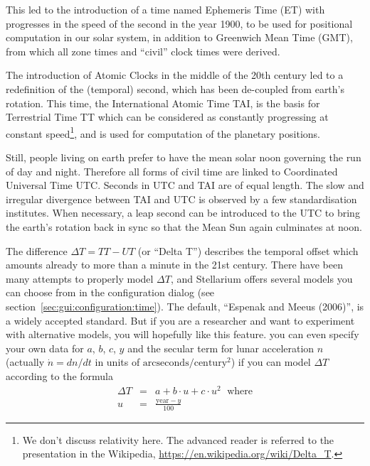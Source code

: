 This led to the introduction of a time named Ephemeris Time (ET) with
progresses in the speed of the second in the year 1900, to be used for
positional computation in our solar system, in addition to Greenwich
Mean Time (GMT), from which all zone times and ``civil'' clock times were
derived.

The introduction of Atomic Clocks in the middle of the 20th century
led to a redefinition of the (temporal) second, which has been
de-coupled from earth's rotation. This time, the International Atomic
Time TAI, is the basis for Terrestrial Time TT which can be
considered as constantly progressing at constant speed\footnote{We
  don't discuss relativity here. The advanced reader is referred to
  the presentation in the Wikipedia,
  \url{https://en.wikipedia.org/wiki/Delta_T}.}, and is used for
computation of the planetary positions.

Still, people living on earth prefer to have the mean solar noon
governing the run of day and night. Therefore all forms of civil time
are linked to Coordinated Universal Time UTC. Seconds in UTC and TAI
are of equal length. The slow and irregular divergence between TAI and
UTC is observed by a few standardisation institutes.  When necessary,
a leap second can be introduced to the UTC to bring the earth's
rotation back in sync so that the Mean Sun again culminates at noon.

The difference $\Delta T=TT-UT$ (or ``Delta T'') describes the
temporal offset which amounts already to more than a minute in the 21st
century. There have been many attempts to properly model $\Delta T$,
and Stellarium offers several models you can choose from in the
configuration dialog (see
section~\ref{sec:gui:configuration:time}). The default, ``Espenak and
Meeus (2006)'', is a widely accepted standard. But if you are a
researcher and want to experiment with alternative models, you will
hopefully like this feature. you can even specify your own data for
$a$, $b$, $c$, $y$ and the secular term for lunar acceleration $n$
(actually $\dot{n}=dn/dt$ in units of
$\mathrm{arcseconds}/\mathrm{century}^2$) if you can model $\Delta T$
according to the formula
\begin{eqnarray}
  \label{eq:DeltaT:custom}
  \Delta T &=& a+ b\cdot u + c \cdot u^2 \, \ \ \text{where}\\
         u &=& \frac{\mathrm{year}-y}{100}
\end{eqnarray}

